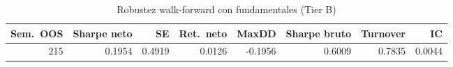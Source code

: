 \begin{table}[htbp]
\centering
\caption{Robustez walk-forward con fundamentales (Tier B)}
\label{tab:rob-fund}
\small
\setlength{\tabcolsep}{4pt}
\begin{tabular}{rrrrrrrr}
\toprule
Sem.\ OOS & Sharpe neto & SE & Ret.\ neto & MaxDD & Sharpe bruto & Turnover & IC \\
\midrule
215 & 0.1954 & 0.4919 & 0.0126 & -0.1956 & 0.6009 & 0.7835 & 0.0044 \\
\bottomrule
\end{tabular}
\end{table}
